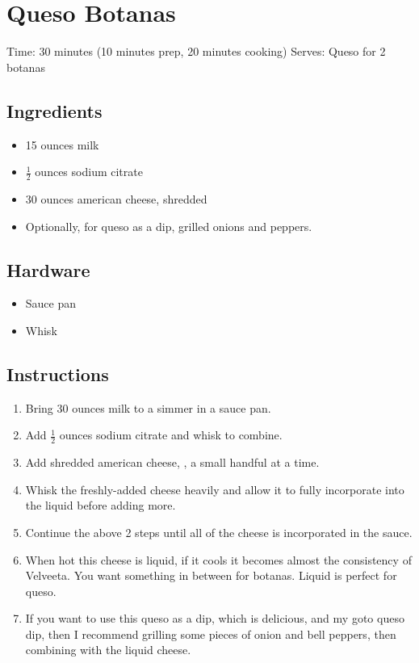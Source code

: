 \section{Queso Botanas}
\label{quesoBotanas}
\setcounter{secnumdepth}{0}
Time: 30 minutes (10 minutes prep, 20 minutes cooking)
Serves: Queso for 2 botanas

\begin{multicols}{2}
\subsection*{Ingredients}
\begin{itemize}
    \item 15 ounces milk
    \item \( \frac{1}{2} \) ounces sodium citrate
    \item 30 ounces american cheese, shredded
    \item Optionally, for queso as a dip, grilled onions and peppers.
\end{itemize}

\subsection*{Hardware}
\begin{itemize}
    \item Sauce pan
    \item Whisk
\end{itemize}
\clearpage

\subsection*{Instructions}
\begin{enumerate}
    \item Bring 30 ounces milk to a simmer in a sauce pan.
    \item Add \( \frac{1}{2} \) ounces sodium citrate and whisk to combine.
    \item Add shredded american cheese, , a small handful at a time.
    \item Whisk the freshly-added cheese heavily and allow it to fully incorporate into the liquid before adding more.
    \item Continue the above 2 steps until all of the cheese is incorporated in the sauce.
    \item When hot this cheese is liquid, if it cools it becomes almost the consistency of Velveeta. You want something in between for botanas. Liquid is perfect for queso.
    \item If you want to use this queso as a dip, which is delicious, and my goto queso dip, then I recommend grilling some pieces of onion and bell peppers, then combining with the liquid cheese.
\end{enumerate}


\end{multicols}
